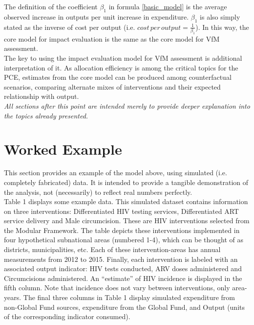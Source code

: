 \documentclass[twocolumn]{bmcart}%
\begin{document}
The definition of the coefficient $\beta_1$ in formula \ref{basic_model} is the average observed increase in outputs per unit increase in expenditure. $\beta_1$ is also simply stated as the inverse of cost per output (i.e. $cost\, per\, output = \frac{1}{\beta_1}$). In this way, the core model for impact evaluation is the same as the core model for VfM assessment. \\

The key to using the impact evaluation model for VfM assessment is additional interpretation of it. As allocation efficiency is among the critical topics for the PCE, estimates from the core model can be produced among counterfactual scenarios, comparing alternate mixes of interventions and their expected relationship with output. \\

\textit{All sections after this point are intended merely to provide deeper explanation into the topics already presented.}

\clearpage



\clearpage


\section{Worked Example}


This section provides an example of the model above, using simulated (i.e. completely fabricated) data. It is intended to provide a tangible demonstration of the analysis, not (necessarily) to reflect real numbers perfectly. \\

Table 1 displays some example data. This simulated dataset contains information on three interventions: Differentiated HIV testing services, Differentiated ART service delivery and Male circumcision. These are HIV interventions selected from the Modular Framework. The table depicts these interventions implemented in four hypothetical subnational areas (numbered 1-4), which can be thought of as districts, municipalities, etc. Each of these intervention-areas has annual measurements from 2012 to 2015. Finally, each intervention is labeled with  an associated output indicator: HIV tests conducted, ARV doses administered and Circumcisions administered. An ``estimate'' of HIV incidence is displayed in the fifth column. Note that incidence does not vary between interventions, only area-years. The final three columns in Table 1 display simulated expenditure from non-Global Fund sources, expenditure from the Global Fund, and Output (units of the corresponding indicator consumed). \\
\end{document}
